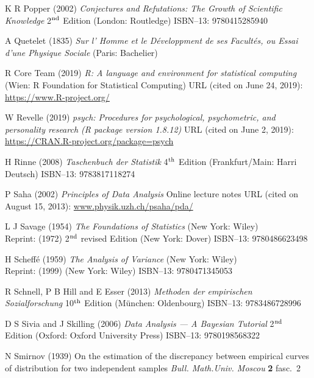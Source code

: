 \begin{thebibliography}{99}
K R Popper
(2002) \textit{Conjectures and Refutations: The Growth of
Scientific Knowledge} 2$^{\rm nd}$ Edition (London: Routledge)
ISBN--13: 9780415285940

A Quetelet
(1835) \textit{Sur l' Homme et le D\'{e}veloppment de ses 
Facult\'{e}s, ou Essai d'une Physique Sociale} (Paris: Bachelier)

R Core Team
(2019) \textit{R: A language and environment for statistical
computing} (Wien: R Foundation for Statistical Computing)
URL (cited on June 24, 2019): \href{https://www.R-project.org/}{https://www.R-project.org/}

W Revelle
(2019) \textit{psych: Procedures for psychological, psychometric,
and personality research (R package version 1.8.12)}
URL (cited on June 2, 2019): 
\href{https://CRAN.R-project.org/package=psych}{https://CRAN.R-project.org/package=psych}

H Rinne
(2008) \textit{Taschenbuch der Statistik}
4$^{\rm th}$ Edition (Frankfurt/Main: Harri Deutsch)
ISBN--13: 9783817118274

P Saha
(2002) \textit{Principles of Data Analysis} Online lecture notes
URL (cited on August 15, 2013):
\href{http://www.physik.uzh.ch/~psaha/pda/pda-a4.pdf}{www.physik.uzh.ch/\texttildelow psaha/pda/}

L J Savage
(1954) \textit{The Foundations of Statistics} (New York: Wiley)\\
Reprint: (1972) 2$^{\rm nd}$ revised Edition (New York: Dover) 
ISBN--13: 9780486623498

H Scheff\'{e}
(1959) \textit{The Analysis of Variance}
(New York: Wiley)\\
Reprint: (1999) (New York: Wiley) ISBN--13: 9780471345053

R Schnell, P B Hill and E Esser
(2013) \textit{Methoden der empirischen Sozialforschung} 10$^{\rm 
th}$ Edition (M\"{u}nchen: Oldenbourg) ISBN--13: 9783486728996

D S Sivia and J Skilling
(2006) \textit{Data Analysis --- A Bayesian Tutorial}
2$^{\rm nd}$ Edition (Oxford: Oxford University Press)
ISBN--13: 9780198568322

N Smirnov
(1939) On the estimation of the discrepancy between empirical 
curves of distribution for two independent samples
\textit{Bull. Math.Univ. Moscou} \textbf{2} fasc.~2


\end{thebibliography}
